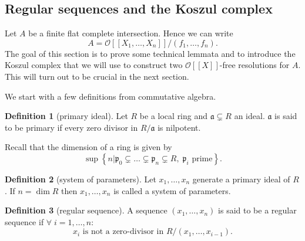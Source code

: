 \documentclass{article}
\theoremstyle{plain}%
\theoremstyle{definition}
\newtheorem{definition}{Definition}[section]
\theoremstyle{remark}
\begin{document}
    \subsection{Regular sequences and the Koszul complex}
    Let \(A\) be a finite flat complete intersection. Hence we can write 
    \[A = \mathcal{O}[[X_1, \dots, X_n]]/(f_1, \dots, f_n).\]
    The goal of this section is to prove some technical lemmata and to introduce
    the Koszul complex that we will use to construct two \(\mathcal{O}[[X]]\)-free resolutions for \(A\).
    This will turn out to be crucial in the next section.

    We start with a few definitions from commutative algebra.
    \begin{definition}[primary ideal]
        Let \(R\) be a local ring and \(\mathfrak{a} \subsetneq R\) an ideal. 
        \(\mathfrak{a}\) is said to be primary if every zero divisor in \(R/\mathfrak{a}\) is nilpotent.
    \end{definition}
    Recall that the dimension of a ring is given by
    \[
        \sup \left\{n | 
                    \mathfrak{p}_0 \subsetneq \dots \subsetneq \mathfrak{p}_n \subsetneq R,\; \mathfrak{p}_i \text{ prime} 
            \right\}.
    \]
    \begin{definition}[system of parameters]
        Let \(x_1, \dots, x_n\) generate a primary ideal of \(R\). If \(n = \dim R\) then \(x_1, \dots, x_n\) is called 
        a system of parameters.
    \end{definition}

    \begin{definition}[regular sequence]
        A sequence \((x_1, \dots, x_n)\) is said to be a regular sequence 
        if \(\forall\; i = 1, \dots, n\colon\)
        \[x_i \text{ is not a zero-divisor in } R/(x_1, \dots, x_{i-1}).\]
    \end{definition}
\end{document}

